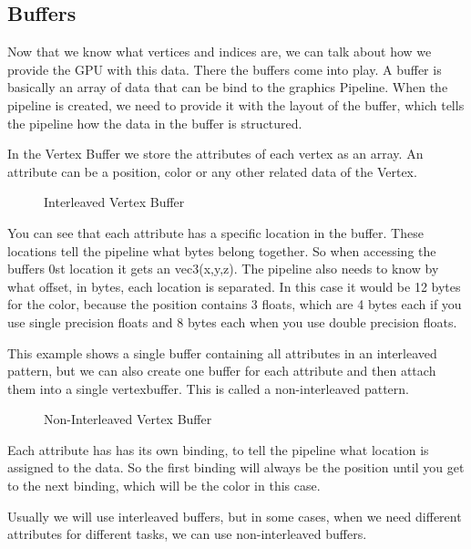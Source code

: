 \documentclass[12pt]{report} \usepackage{preamble}
\begin{document}
\subsection{Buffers}

Now that we know what vertices and indices are, we can talk about how we
provide the GPU with this data. There the buffers come into play. A buffer
is basically an array of data that can be bind to the graphics Pipeline.
When the pipeline is created, we need to provide it with the layout of the
buffer, which tells the pipeline how the data in the buffer is structured.
\cite{vulkan-tutorial-vertex-buffer}

In the Vertex Buffer we store the attributes of each vertex as an
array. An attribute can be a position, color or any other related data
of the Vertex. \cite{vulkan-tutorial-vertex-buffer}

\begin{figure}[hbtp]
	\centering 
	\caption{Interleaved Vertex Buffer}
\end{figure} \FloatBarrier

You can see that each attribute has a specific location in the buffer.
These locations tell the pipeline what bytes belong together. So when
accessing the buffers 0st location it gets an vec3(x,y,z).  The pipeline
also needs to know by what offset, in bytes, each location is separated.
In this case it would be 12 bytes for the color, because the position
contains 3 floats, which are 4 bytes each if you use single precision
floats and 8 bytes each when you use double precision floats. \cite{vulkan-tutorial-vertex-buffer}

This example shows a single buffer containing all attributes in
an interleaved pattern, but we can also create one buffer for each
attribute and then attach them into a single vertexbuffer. This is called
a non-interleaved pattern.

\begin{figure}[hbtp]
	
	\caption{Non-Interleaved Vertex Buffer}
\end{figure} \FloatBarrier

Each attribute has has its own binding, to tell the pipeline what location
is assigned to the data. So the first binding will always be the position
until you get to the next binding, which will be the color in this case.
\cite{vulkan-tutorial-vertex-buffer}

Usually we will use interleaved buffers, but in some cases, when we need
different attributes for different tasks, we can use non-interleaved
buffers.
\end{document}
